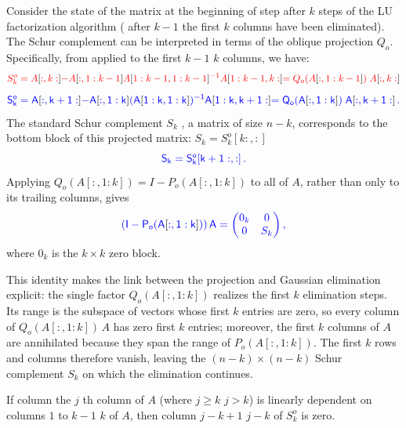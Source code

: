 \documentclass[10pt,twoside]{siamart1116}
\numberwithin{theorem}{section}
\providecommand{\DIFadd}[1]{{\protect\color{blue} \sf #1}} %
\providecommand{\DIFdel}[1]{{\protect\color{red} \scriptsize #1}} %
\providecommand{\DIFaddbegin}{} %
\providecommand{\DIFaddend}{} %
\providecommand{\DIFdelbegin}{} %
\providecommand{\DIFdelend}{} %
\begin{document}
Consider the state of the matrix \DIFdelbegin \DIFdel{at the beginning of step }\DIFdelend \DIFaddbegin \DIFadd{after }\DIFaddend $k$ \DIFaddbegin \DIFadd{steps }\DIFaddend of the LU factorization algorithm (\DIFdelbegin \DIFdel{after $k-1$ }\DIFdelend \DIFaddbegin \DIFadd{the first $k$ }\DIFaddend columns have been eliminated). The Schur complement can be interpreted in terms of the oblique projection $Q_o$. Specifically, from  applied to the first \DIFdelbegin \DIFdel{$k-1$ }\DIFdelend \DIFaddbegin \DIFadd{$k$ }\DIFaddend columns, we have:
\DIFdelbegin \[ \DIFdel{S^o_k = A}[\DIFdel{:,k:}] \DIFdel{- A}[\DIFdel{:,1:k-1}] {\DIFdel{A}[\DIFdel{1:k-1,1:k-1}]}\DIFdel{^{-1} A}[\DIFdel{1:k-1,k:}]
	\DIFdel{= Q_o(A}[\DIFdel{:,1:k-1}]\DIFdel{) \; A}[\DIFdel{:,k:}]
\DIFdel{}\]%
\DIFdelend \DIFaddbegin \[ \DIFadd{S^o_k = A}[\DIFadd{:,k+1:}] \DIFadd{- A}[\DIFadd{:,1:k}] {\DIFadd{(A}[\DIFadd{1:k,1:k}]\DIFadd{)}}\DIFadd{^{-1} A}[\DIFadd{1:k,k+1:}]
  \DIFadd{= Q_o(A}[\DIFadd{:,1:k}]\DIFadd{) \; A}[\DIFadd{:,k+1:}] \DIFadd{\,.
}\]\DIFaddend 
The standard Schur complement $S_k$\DIFaddbegin \DIFadd{, a matrix of size $n-k$, }\DIFaddend corresponds to the bottom block of this projected matrix:
\DIFdelbegin \DIFdel{$S_k = S^o_k[k:,:]$}\DIFdelend \DIFaddbegin \[ \DIFadd{S_k = S^o_k[k+1:,:] \,. }\]
\DIFadd{Applying $Q_o(A[:,1:k]) = I - P_o(A[:,1:k])$ to all of $A$, rather than only to its trailing columns, gives
}\[ \DIFadd{(I - P_o(A}[\DIFadd{:,1:k}]\DIFadd{)) \, A =
  \begin{pmatrix}
    0_k & 0   \\
    0   & S_k
  \end{pmatrix},
}\]
\DIFadd{where $0_k$ is the $k \times k$ zero block}\DIFaddend .

\DIFaddbegin \DIFadd{This identity makes the link between the projection and Gaussian elimination explicit: the single factor $Q_o(A[:,1:k])$ realizes the first $k$ elimination steps. Its range is the subspace of vectors whose first $k$ entries are zero, so every column of $Q_o(A[:,1:k])\,A$ has zero first $k$ entries; moreover, the first $k$ columns of $A$ are annihilated because they span the range of $P_o(A[:,1:k])$. The first $k$ rows and columns therefore vanish, leaving the $(n-k) \times (n-k)$ Schur complement $S_k$ on which the elimination continues.
}

\DIFaddend \begin{lemma}\label{lem:oblique}
  If \DIFdelbegin \DIFdel{column }\DIFdelend \DIFaddbegin \DIFadd{the }\DIFaddend $j$\DIFaddbegin \DIFadd{th column }\DIFaddend of $A$ (where \DIFdelbegin \DIFdel{$j \ge k$}\DIFdelend \DIFaddbegin \DIFadd{$j > k$}\DIFaddend ) is linearly dependent on columns $1$ to \DIFdelbegin \DIFdel{$k-1$ }\DIFdelend \DIFaddbegin \DIFadd{$k$ }\DIFaddend of $A$, then column \DIFdelbegin \DIFdel{$j - k + 1$ }\DIFdelend \DIFaddbegin \DIFadd{$j - k$ }\DIFaddend of $S^o_k$ is zero.
\end{lemma}
\end{document}
